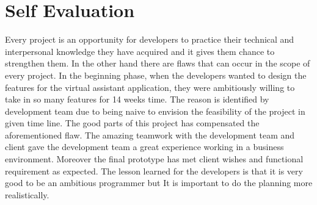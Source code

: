 \section{Self Evaluation} %
\label{sec:self_evaluation}

Every project is an opportunity for developers to practice their technical and interpersonal knowledge they have acquired and it gives them chance to strengthen them. In the other hand there are flaws that can occur in the scope of every project. In the beginning phase, when the developers wanted to design the features for the virtual assistant application, they were ambitiously willing to take in so many features for 14 weeks time. The reason is identified by development team due to being naive to envision the feasibility of the project in given time line. The good parts of this project has compensated the aforementioned flaw. The amazing teamwork with the development team and client gave the development team a great experience working in a business environment. Moreover the final prototype has met client wishes and functional requirement as expected. The lesson learned for the developers is that it is very good to be an ambitious programmer but It is important to do the planning more realistically. 